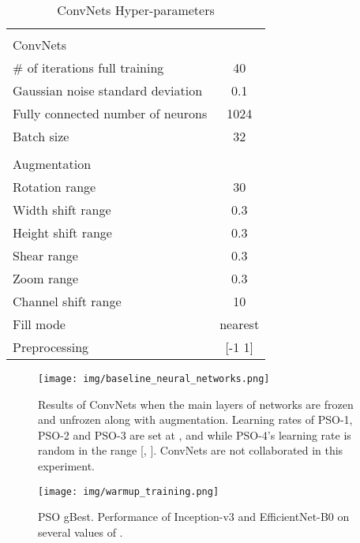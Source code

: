 \documentclass{ieeeaccess}
\begin{document}
\begin{table}[htb!]
\centering
\caption{\label{tab:table_parameters}ConvNets Hyper-parameters}
\begin{tabular}{lc} 
\hline
& \multicolumn{1}{l}{}         \\
ConvNets                 &                              \\
\# of iterations full training    & 40                           \\
Gaussian noise standard deviation & 0.1                          \\
Fully connected number of neurons & 1024                         \\
Batch size                        & 32                           \\
                                  & \multicolumn{1}{l}{}         \\
Augmentation                      & \multicolumn{1}{l}{}         \\
Rotation range                    & 30                           \\
Width shift range                 & 0.3                          \\
Height shift range                & 0.3                          \\
Shear range                       & 0.3                          \\
Zoom range                        & 0.3                          \\
Channel shift range               & 10                           \\
Fill mode                         & \multicolumn{1}{l}{nearest}  \\
Preprocessing                     & {[}-1 1]                     \\
\hline
\end{tabular}
\end{table} \begin{figure*}[htb!]
\centering
\texttt{[image: img/baseline\_neural\_networks.png]}
\caption{Results of ConvNets when the main layers of networks are frozen and unfrozen along with augmentation. Learning rates of PSO-1, PSO-2 and PSO-3 are set at ,  and  while PSO-4's learning rate is random in the range [, ]. ConvNets are not collaborated in this experiment.}
\label{fig:baseline_neural_networks}
\end{figure*}
\begin{figure*}[htb!]
\begin{center}
\texttt{[image: img/warmup\_training.png]}
\caption{PSO gBest. Performance of Inception-v3 and EfficientNet-B0 on several values of .}
\label{fig:baseline_pso}
\end{center}
\end{figure*}
\end{document}
